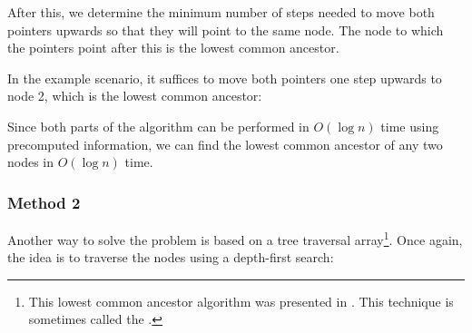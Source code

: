 After this, we determine the minimum number of steps
needed to move both pointers upwards so that
they will point to the same node.
The node to which the pointers point after this
is the lowest common ancestor.

In the example scenario, it suffices to move both pointers
one step upwards to node 2,
which is the lowest common ancestor:

\begin{center}
\end{center}

Since both parts of the algorithm can be performed in
$O(\log n)$ time using precomputed information,
we can find the lowest common ancestor of any two
nodes in $O(\log n)$ time.

\subsubsection{Method 2}

Another way to solve the problem is based on
a tree traversal array\footnote{This lowest common ancestor algorithm was presented in \cite{ben00}.
This technique is sometimes called the 
 \cite{tar84}.}.
Once again, the idea is to traverse the nodes
using a depth-first search:

